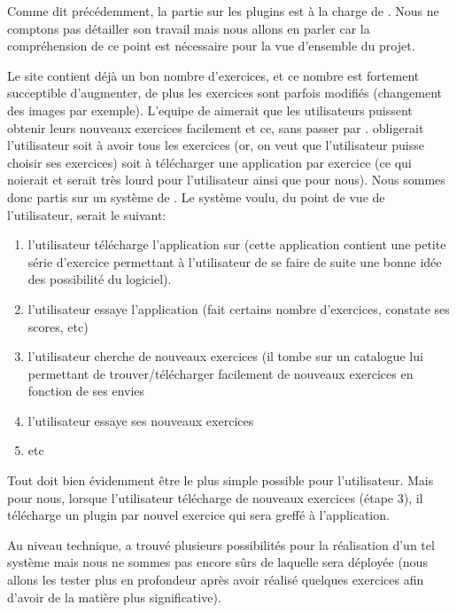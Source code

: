 Comme dit précédemment, la partie sur les plugins est à la charge de \etudiantSL{}. Nous ne comptons pas détailler son travail mais nous allons en parler car la compréhension de ce point est nécessaire pour la vue d'ensemble du projet.

Le site \pepit{} contient déjà un bon nombre d'exercices, et ce nombre est fortement succeptible d'augmenter, de plus les exercices sont parfois modifiés (changement des images par exemple). L'equipe de \pepit{} aimerait que les utilisateurs puissent obtenir leurs nouveaux exercices facilement et ce, sans passer par \market{}. \market{} obligerait l'utilisateur soit à avoir tous les exercices (or, on veut que l'utilisateur puisse choisir ses exercices) soit à télécharger une application par exercice (ce qui noierait \market{} et serait très lourd pour l'utilisateur ainsi que pour nous).
\newline
Nous sommes donc partis sur un système de \plugins{}. Le système voulu, du point de vue de l'utilisateur, serait le suivant:
\begin{enumerate}
	\item l'utilisateur télécharge l'application sur \market{} (cette application contient une petite série d'exercice permettant à l'utilisateur de se faire de suite une bonne idée des possibilité du logiciel).
	\item l'utilisateur essaye l'application (fait certains nombre d'exercices, constate ses scores, etc)
	\item l'utilisateur cherche de nouveaux exercices (il tombe sur un catalogue lui permettant de trouver/télécharger facilement de nouveaux exercices en fonction de ses envies
	\item l'utilisateur essaye ses nouveaux exercices
	\item etc
\end{enumerate}
Tout doit bien évidemment être le plus simple possible pour l'utilisateur. Mais pour nous, lorsque l'utilisateur télécharge de nouveaux exercices (étape 3), il télécharge un plugin par nouvel exercice qui sera greffé à l'application. 

Au niveau technique, \etudiantSL{} a trouvé plusieurs possibilités pour la réalisation d'un tel système mais nous ne sommes pas encore sûrs de laquelle sera déployée (nous allons les tester plus en profondeur après avoir réalisé quelques exercices afin d'avoir de la matière plus significative).
